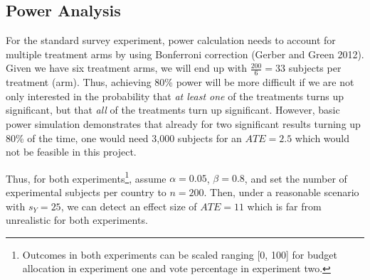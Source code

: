 \documentclass[11pt]{article}
\begin{document}
\begin{table}[H]
\caption{Hypotheses, Specifications and Measures}\label{tab:tab2}
\end{table}

\subsection{Power Analysis}
For the standard survey experiment, power calculation needs to account for multiple treatment arms by using Bonferroni correction (Gerber and Green 2012). Given we have six treatment arms, we will end up with $\frac{200}{6} = 33$ subjects per treatment (arm). Thus, achieving 80\% power will be more difficult if we are not only interested in the probability that \textit{at least one} of the treatments turns up significant, but that \textit{all} of the treatments turn up significant. However, basic power simulation demonstrates that already for two significant results turning up 80\% of the time, one would need 3,000 subjects for an $ATE = 2.5$ which would not be feasible in this project.

Thus, for both experiments\footnote{Outcomes in both experiments can be scaled ranging [0, 100] for budget allocation in experiment one and vote percentage in experiment two.}, assume $\alpha = 0.05$, $\beta = 0.8$, and set the number of experimental subjects per country to $n = 200$. Then, under a reasonable scenario with $s_Y = 25$, we can detect an effect size of $ATE = 11$ which is far from unrealistic for both experiments.
\end{document}
